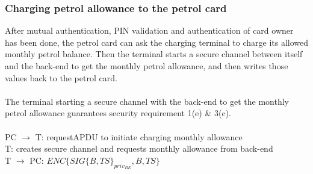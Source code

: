 \subsubsection{Charging petrol allowance to the petrol card}
After mutual authentication, PIN validation and authentication of card owner
has been done, the petrol card can ask the charging terminal to charge its
allowed monthly petrol balance. Then the terminal starts a secure channel
between itself and the back-end to get the monthly petrol allowance, and then
writes those values back to the petrol card.
\\
\\
The terminal starting a secure channel with the back-end to get the monthly petrol allowance guarantees security requirement 1(e) \& 3(c).
\\
\\
PC $\to$ T: requestAPDU to initiate charging monthly allowance \\
T: creates secure channel and requests monthly allowance from back-end \\
T $\to$ PC: $ENC\{SIG\{B,TS\}_{priv_{BE}}, B, TS\}$
